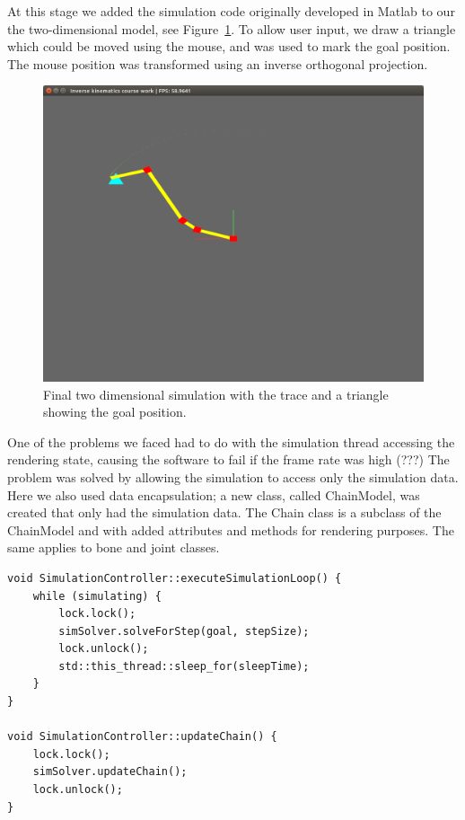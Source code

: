 \documentclass[paper=a4, fontsize=11pt]{scrartcl} %
\numberwithin{equation}{section} %
\numberwithin{figure}{section} %
\numberwithin{table}{section} %
\begin{document}
At this stage we added the simulation code originally developed in Matlab to our the two-dimensional model, see Figure~\ref{fig:2Dpicture}. To allow user input, we draw a triangle which could be moved using the mouse, and was used to mark the goal position. The mouse position was transformed using an inverse orthogonal projection. \\

\begin{figure}[h]
\centering
\includegraphics[scale=0.4]{chain2Dv2}
\caption{Final two dimensional simulation with the trace and a triangle showing the goal position.}
\label{fig:2Dpicture}
\end{figure}

One of the problems we faced had to do with the simulation thread accessing the rendering state, causing the software to fail if the frame rate was high (???) The problem was solved by allowing the simulation to access only the simulation data. Here we also used data encapsulation; a new class, called ChainModel, was created that only had the simulation data. The Chain class is a subclass of the ChainModel and with added attributes and methods for rendering purposes. The same applies to bone and joint classes. \\

\begin{lstlisting}[float,caption=Simulation controller thread synchronisation., label={lst:synchronisation}]		
void SimulationController::executeSimulationLoop() {
	while (simulating) {
		lock.lock();
		simSolver.solveForStep(goal, stepSize);
		lock.unlock();
		std::this_thread::sleep_for(sleepTime);
	}
}

void SimulationController::updateChain() {
	lock.lock();
	simSolver.updateChain();
	lock.unlock();
}
\end{lstlisting}
\end{document}
